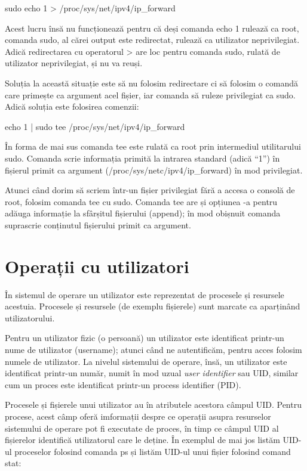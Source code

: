 \begin{screen}
sudo echo 1 > /proc/sys/net/ipv4/ip_forward
\end{screen}

Acest lucru însă nu funcționează pentru că deși comanda echo 1 rulează ca root,
comanda sudo, al cărei output este redirectat, rulează ca utilizator
neprivilegiat. Adică redirectarea cu operatorul > are loc pentru comanda sudo,
rulată de utilizator neprivilegiat, și nu va reuși.

Soluția la această situație este să nu folosim redirectare ci să folosim o
comandă care primește ca argument acel fișier, iar comanda să ruleze privilegiat
ca sudo. Adică soluția este folosirea comenzii:

\begin{screen}
echo 1 | sudo tee /proc/sys/net/ipv4/ip_forward
\end{screen}

În forma de mai sus comanda tee este rulată ca root prin intermediul
utilitarului sudo. Comanda scrie informația primită la intrarea standard (adică
“1”) în fișierul primit ca argument (/proc/sys/netc/ipv4/ip_forward) în mod
privilegiat.

\begin{note}[NOTĂ]
Atunci când dorim să scriem într-un fișier privilegiat fără a accesa o
consolă de root, folosim comanda tee cu sudo. Comanda tee are și opțiunea -a
pentru adăuga informație la sfârșitul fișierului (append); în mod obișnuit
comanda suprascrie conținutul fișierului primit ca argument.
\end{note}

\section{Operații cu utilizatori}
\label{sec:users-ops}

În sistemul de operare un utilizator este reprezentat de procesele și resursele
acestuia. Procesele și resursele (de exemplu fișierele) sunt marcate ca
aparținând utilizatorului.

Pentru un utilizator fizic (o persoană) un utilizator este identificat printr-un
nume de utilizator (username); atunci când ne autentificăm, pentru acces folosim
numele de utilizator. La nivelul sistemului de operare, însă, un utilizator este
identificat printr-un număr, numit în mod uzual \textit{user identifier} sau
UID, similar cum un proces este identificat printr-un process identifier (PID).

Procesele și fișierele unui utilizator au în atributele acestora câmpul UID.
Pentru procese, acest câmp oferă imformații despre ce operații asupra resurselor
sistemului de operare pot fi executate de proces, în timp ce câmpul UID al
fișierelor identifică utilizatorul care le deține. În exemplul de mai jos listăm
UID-ul proceselor folosind comanda ps și listăm UID-ul unui fișier folosind
comand stat:

